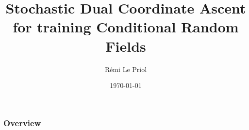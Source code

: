 \documentclass{beamer}
\title[SDCA for CRF]{Stochastic Dual Coordinate Ascent for training Conditional Random Fields} %
\author{R\'emi Le Priol} %
\institute[MILA] %
{
Montreal Institute of Learning Algorithms \\ %
\medskip
\textit{remi.lp.17@gmail.com} %
}
\date{\today} %
\DeclareMathOperator{\1}{\mathbb{1}}
\begin{document}
\begin{frame}
\titlepage %
\end{frame}

\begin{frame}
\frametitle{Overview} %
\tableofcontents %
\end{frame}


\end{document}
